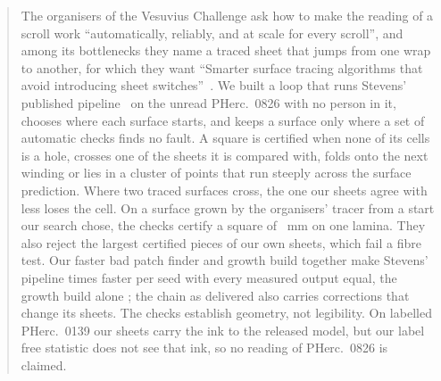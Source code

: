 %
%

\maketitle

\begin{abstract}
The organisers of the Vesuvius Challenge ask how to make the reading of a scroll work ``automatically, reliably, and
at scale for every scroll'', and among its bottlenecks they name a traced sheet that jumps from one wrap to another,
for which they want ``Smarter surface tracing algorithms that avoid introducing sheet switches''~\cite{openproblems}.
We built a loop that runs Stevens' published pipeline~\cite{stevenssr} on the unread PHerc.~0826 with no person in it,
chooses where each surface starts, and keeps a surface only where a set of automatic checks finds no fault. A square is certified when none of its cells is a hole,
crosses one of the sheets it is compared with, folds onto the next winding or lies in a cluster of points that run
steeply across the surface prediction. Where two traced surfaces cross, the one our sheets agree with less loses the
cell. On a surface grown by the organisers' tracer from a
start our search chose, the checks certify a square of \RcOneSquare{}~mm on one lamina. They also reject the
\FibreTopFailCount{} largest certified pieces of our own sheets, which fail a fibre test. Our faster bad patch finder
and growth build together make Stevens' pipeline \ArmFactorAC{} times faster per seed with every measured output
equal, the growth build alone \ArmFactorBC{}; the chain as delivered also carries \CorrOutput{} corrections that change
its sheets. The checks
establish geometry, not legibility. On labelled PHerc.~0139 our sheets carry the ink to the released model, but our label
free statistic does not see that ink, so no reading of PHerc.~0826 is claimed.
\end{abstract}

